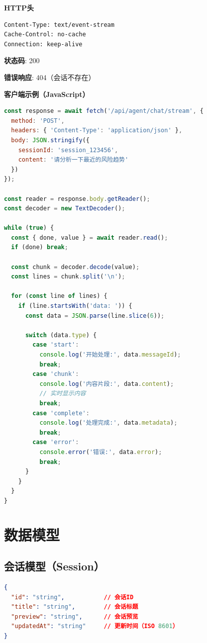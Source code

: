 \documentclass[12pt,a4paper]{article}
\begin{document}
\textbf{HTTP头}

\begin{lstlisting}[language=bash]
Content-Type: text/event-stream
Cache-Control: no-cache
Connection: keep-alive
\end{lstlisting}

\textbf{状态码}: 200

\textbf{错误响应}: 404（会话不存在）

\textbf{客户端示例（JavaScript）}

\begin{lstlisting}[language=javascript]
const response = await fetch('/api/agent/chat/stream', {
  method: 'POST',
  headers: { 'Content-Type': 'application/json' },
  body: JSON.stringify({
    sessionId: 'session_123456',
    content: '请分析一下最近的风险趋势'
  })
});

const reader = response.body.getReader();
const decoder = new TextDecoder();

while (true) {
  const { done, value } = await reader.read();
  if (done) break;
  
  const chunk = decoder.decode(value);
  const lines = chunk.split('\n');
  
  for (const line of lines) {
    if (line.startsWith('data: ')) {
      const data = JSON.parse(line.slice(6));
      
      switch (data.type) {
        case 'start':
          console.log('开始处理:', data.messageId);
          break;
        case 'chunk':
          console.log('内容片段:', data.content);
          // 实时显示内容
          break;
        case 'complete':
          console.log('处理完成:', data.metadata);
          break;
        case 'error':
          console.error('错误:', data.error);
          break;
      }
    }
  }
}
\end{lstlisting}

\section{数据模型}

\subsection{会话模型（Session）}

\begin{lstlisting}[language=json]
{
  "id": "string",           // 会话ID
  "title": "string",        // 会话标题
  "preview": "string",      // 会话预览
  "updatedAt": "string"     // 更新时间（ISO 8601）
}
\end{lstlisting}
\end{document}
